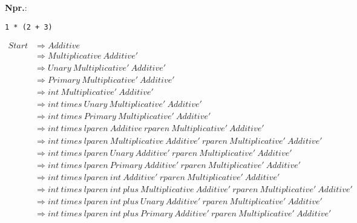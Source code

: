 \documentclass{report}
\newcommand{\Ex}{\textbf{Npr.}:\ }
\newcommand{\Spc}{\ }
\newlength{\arrow}
\newcommand{\Derive}{\Rightarrow}
\newcommand{\NT}[1]{{#1}}
\newcommand{\T}[1]{{#1}}
\begin{document}
\newpage
\Ex
\begin{lstlisting}
1 * (2 + 3)
\end{lstlisting}
\begin{equation*}
  \begin{aligned}
    \NT{Start} &\Derive \NT{Additive}\\
    &\Derive \NT{Multiplicative} \Spc \NT{Additive'}\\
    &\Derive \NT{Unary} \Spc \NT{Multiplicative'} \Spc \NT{Additive'}\\
    &\Derive \NT{Primary} \Spc \NT{Multiplicative'} \Spc \NT{Additive'}\\
    &\Derive \T{int} \Spc \NT{Multiplicative'} \Spc \NT{Additive'}\\
    &\Derive \T{int} \Spc \T{times} \Spc \NT{Unary} \Spc \NT{Multiplicative'} \Spc \NT{Additive'}\\
    &\Derive \T{int} \Spc \T{times} \Spc \NT{Primary} \Spc \NT{Multiplicative'} \Spc \NT{Additive'}\\
    &\Derive \T{int} \Spc \T{times} \Spc \T{lparen} \Spc \NT{Additive} \Spc \T{rparen} \Spc \NT{Multiplicative'} \Spc \NT{Additive'}\\
    &\Derive \T{int} \Spc \T{times} \Spc \T{lparen} \Spc \NT{Multiplicative} \Spc \NT{Additive'} \Spc \T{rparen} \Spc \NT{Multiplicative'} \Spc \NT{Additive'}\\
    &\Derive \T{int} \Spc \T{times} \Spc \T{lparen} \Spc \NT{Unary} \Spc \NT{Additive'} \Spc \T{rparen} \Spc \NT{Multiplicative'} \Spc \NT{Additive'}\\
    &\Derive \T{int} \Spc \T{times} \Spc \T{lparen} \Spc \NT{Primary} \Spc \NT{Additive'} \Spc \T{rparen} \Spc \NT{Multiplicative'} \Spc \NT{Additive'}\\
    &\Derive \T{int} \Spc \T{times} \Spc \T{lparen} \Spc \T{int} \Spc \NT{Additive'} \Spc \T{rparen} \Spc \NT{Multiplicative'} \Spc \NT{Additive'}\\
    &\Derive \T{int} \Spc \T{times} \Spc \T{lparen} \Spc \T{int} \Spc \T{plus} \Spc \NT{Multiplicative} \Spc \NT{Additive'} \Spc \T{rparen} \Spc \NT{Multiplicative'} \Spc \NT{Additive'}\\
    &\Derive \T{int} \Spc \T{times} \Spc \T{lparen} \Spc \T{int} \Spc \T{plus} \Spc \NT{Unary} \Spc \NT{Additive'} \Spc \T{rparen} \Spc \NT{Multiplicative'} \Spc \NT{Additive'}\\
    &\Derive \T{int} \Spc \T{times} \Spc \T{lparen} \Spc \T{int} \Spc \T{plus} \Spc \NT{Primary} \Spc \NT{Additive'} \Spc \T{rparen} \Spc \NT{Multiplicative'} \Spc \NT{Additive'}\\

\end{aligned}
\end{equation*}
\end{document}
